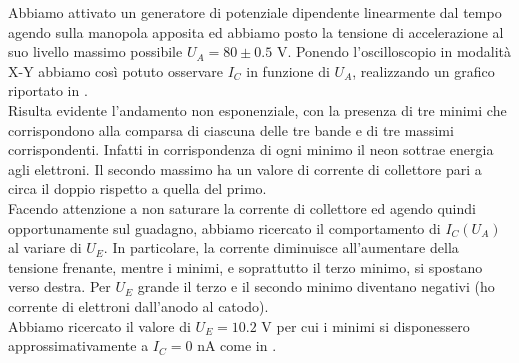Abbiamo attivato un generatore di potenziale dipendente linearmente dal tempo agendo sulla manopola apposita ed abbiamo posto la tensione di accelerazione al suo livello massimo possibile $U_A = 80 \pm 0.5$ V. Ponendo l'oscilloscopio in modalità X-Y abbiamo così potuto osservare $I_C$ in funzione di $U_A$, realizzando un grafico riportato in . \\
Risulta evidente l'andamento non esponenziale, con la presenza di tre minimi che corrispondono alla comparsa di ciascuna delle tre bande e di tre massimi corrispondenti. Infatti in corrispondenza di ogni minimo il neon sottrae energia agli elettroni. Il secondo massimo ha un valore di corrente di collettore pari a circa il doppio rispetto a quella del primo.\\
Facendo attenzione a non saturare la corrente di collettore ed agendo quindi opportunamente sul guadagno, abbiamo ricercato il comportamento di $I_C(U_A)$ al variare di $U_E$. In particolare, la corrente diminuisce all'aumentare della tensione frenante, mentre i minimi, e soprattutto il terzo minimo, si spostano verso destra. Per $U_E$ grande il terzo e il secondo minimo diventano negativi (ho corrente di elettroni dall'anodo al catodo).\\
Abbiamo ricercato il valore di $U_E = 10.2$ V per cui i minimi si disponessero approssimativamente a $I_C = 0$ nA come in .\\
